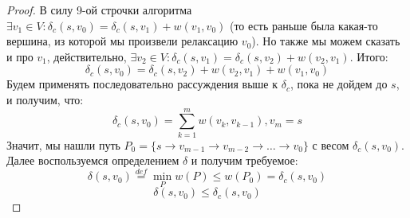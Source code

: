 \begin{proof}
    В силу 9-ой строчки алгоритма $\exists v_1 \in V: \delta_c(s, v_0) = \delta_c(s, v_1) + w(v_1, v_0)$ (то есть раньше была какая-то вершина, из которой мы произвели релаксацию $v_0$). Но также мы можем сказать и про $v_1$, действительно, $\exists v_2 \in V: \delta_c(s, v_1) = \delta_c(s, v_2) + w(v_2, v_1)$. Итого:
    \begin{equation*}
        \delta_c(s, v_0) = \delta_c(s, v_2) + w(v_2, v_1) + w(v_1, v_0)
    \end{equation*}
    Будем применять последовательно рассуждения выше к $\delta_c$, пока не дойдем до $s$, и получим, что:
    \begin{equation*}
        \delta_c(s, v_0) = \sum\limits_{k=1}^{m} w(v_{k}, v_{k - 1}), v_m = s
    \end{equation*}
    Значит, мы нашли путь $P_0 = \{s \rightarrow v_{m - 1} \rightarrow v_{m - 2} \rightarrow \dots \rightarrow v_0\}$ с весом $\delta_c(s, v_0)$. Далее воспользуемся определением $\delta$ и получим требуемое:
    \begin{equation*}
        \delta(s, v_0) \overset{def}{=} \min\limits_{P} w(P) \leq w(P_0) = \delta_c(s, v_0)
    \end{equation*}
    \begin{equation*}
        \delta(s, v_0) \leq \delta_c(s, v_0)
    \end{equation*}
\end{proof}


